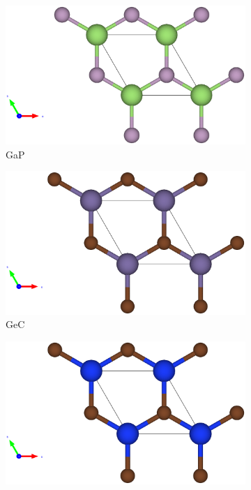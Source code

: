 \begin{figure}[htb]
\medskip
\begin{subfigure}{0.3\textwidth}
  \includegraphics[width=\linewidth]{images/gap_st_2d.eps}
  \caption{GaP}
\end{subfigure}\hfil %
\begin{subfigure}{0.3\textwidth}
  \includegraphics[width=\linewidth]{images/gec_st_2d.eps}
  \caption{GeC}
\end{subfigure}\hfil %
\begin{subfigure}{0.3\textwidth}
  \includegraphics[width=\linewidth]{images/sic_st_2d.eps}

\end{subfigure}
\end{figure}

